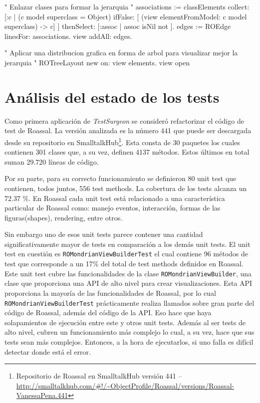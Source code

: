 \begin{code}
" Enlazar clases para formar la jerarquia "
associations := classElements collect: [:c |
	(c model superclass = Object)
		ifFalse: [ (view elementFromModel: c
		model superclass) -> c]
	] thenSelect: [:assoc | assoc isNil not ].
edges := ROEdge linesFor: associations.
view addAll: edges.

" Aplicar una distribucion grafica en forma de arbol para visualizar mejor la jerarquia "
ROTreeLayout new on: view elements.
view open

\end{code}


\section{Análisis del estado de los tests}

\par Como primera aplicación de \emph{TestSurgeon} se consideró refactorizar el código de test de Roassal. La versión analizada es la número 441 que puede ser descargada desde su repositorio en SmalltalkHub\footnote{Repositorio de Roassal en SmalltalkHub versión 441 -- \url{http://smalltalkhub.com/\#!/~ObjectProfile/Roassal/versions/Roassal-VanessaPena.441} }. Esta consta de 30 paquetes los cuales contienen 301 clases que, a su vez, definen 4137 métodos. Estos últimos en total suman 29.720 líneas de código.

\par Por su parte, para su correcto funcionamiento se definieron 80 unit test que contienen, todos juntos, 556 test methods. La cobertura de los tests alcanza un 72.37 \%.  En Roassal cada unit test está relacionado a una característica particular de Roassal como: manejo eventos, interacción, formas de las figuras(shapes), rendering, entre otros. 

\par Sin embargo uno de esos unit tests parece contener una cantidad significativamente mayor de tests en comparación a los demás unit tests.  El unit test en cuestión es {\tt ROMondrianViewBuilderTest} el cual contiene 96 métodos de test que corresponde a un 17\% del total de test methods definidos en Roassal. Este unit test cubre las funcionalidades de la clase {\tt ROMondrianViewBuilder}, una clase que proporciona una API de alto nivel para crear visualizaciones. Esta API proporciona la mayoría de las funcionalidades de Roassal, por lo cual {\tt ROMondrianViewBuilderTest} prácticamente realiza llamados sobre gran parte del código de Roassal, además del código de la API. Eso hace que haya solapamientos de ejecución entre este y otros unit tests. Además al ser tests de alto nivel, cubren un funcionamiento más complejo lo cual, a su vez, hace que sus tests sean más complejos. Entonces, a la hora de ejecutarlos, si uno falla es difícil detectar donde está el error.

